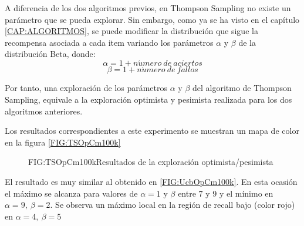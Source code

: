 A diferencia de los dos algoritmos previos, en Thompson Sampling no existe un parámetro que se pueda explorar. Sin embargo, como ya se ha visto en el capítulo \ref{CAP:ALGORITMOS}, se puede modificar la distribución que sigue la recompensa asociada a cada item variando los parámetros $\alpha$ y $\beta$ de la distribución Beta, donde:
$$\alpha = 1+ n\acute{u}mero \ de \ aciertos$$
$$\beta = 1+ n\acute{u}mero \ de \ fallos$$

Por tanto, una exploración de los parámetros $\alpha$ y $\beta$ del algoritmo de Thompson Sampling, equivale a la exploración optimista y pesimista realizada para los dos algoritmos anteriores.

Los resultados correspondientes a este experimento se muestran un mapa de color en la figura \ref{FIG:TSOpCm100k}

\begin{figure}[Mapa de color de Thompson Sampling]{FIG:TSOpCm100k}{Resultados de la exploración optimista/pesimista}
\end{figure}

El resultado es muy similar al obtenido en \ref{FIG:UcbOpCm100k}. En esta ocasión el máximo se alcanza para valores de $\alpha=1$ y $\beta$ entre 7 y 9 y el mínimo en $\alpha=9, \ \beta=2$. Se observa un máximo local en la región de recall bajo (color rojo) en $\alpha=4, \ \beta=5$
